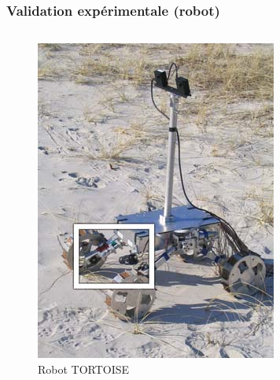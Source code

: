     \begin{frame}
        \frametitle{Validation expérimentale (robot)}
        \begin{columns}[c]
            \begin{column}{0.5\textwidth}
                \begin{figure}
                    \includegraphics[height=0.6\textheight]{./media/tortoise.jpg}
                    \captionsetup{justification=centering}                         
                    \caption{Robot TORTOISE}
                \end{figure}
            \end{column}
            

\end{columns}
\end{frame}
